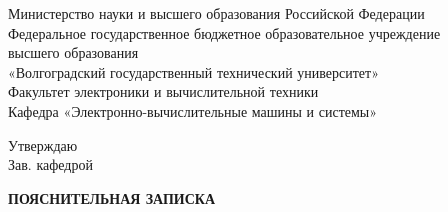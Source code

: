 \thispagestyle{empty}

\begin{nospasing}
	\begin{center}
		Министерство науки и высшего образования Российской Федерации \\
		Федеральное государственное бюджетное образовательное учреждение \\
		высшего образования \\
		«Волгоградский государственный технический университет» \\
		Факультет электроники и вычислительной техники \\
		Кафедра «Электронно-вычислительные машины и системы» \\
	\end{center}
\end{nospasing}

\hfill
\begin{minipage}[t]{0.4\linewidth}
	Утверждаю \\
	Зав. кафедрой \\
	  
\end{minipage}

\bigskip
\bigskip
\bigskip

\begin{center}
	\textbf{ПОЯСНИТЕЛЬНАЯ ЗАПИСКА}
\end{center}

